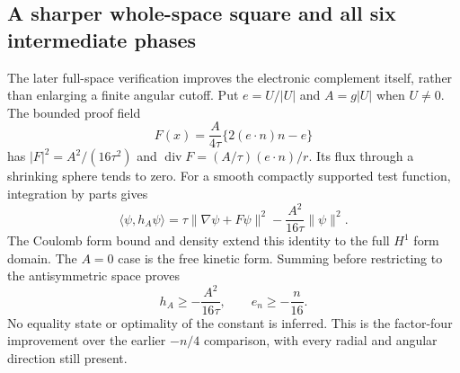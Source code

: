 \subsection{A sharper whole-space square and all six intermediate phases}
\label{sec:atomic-square-12}

The later full-space verification improves the electronic complement itself,
rather than enlarging a finite angular cutoff. Put $e=U/|U|$ and $A=g|U|$
when $U\ne0$. The bounded proof field
\begin{equation}
 F(x)=\frac{A}{4\tau}\{2(e\cdot n)n-e\}
\label{eq:point-proof-field-12}
\end{equation}
has $|F|^2=A^2/(16\tau^2)$ and
$\operatorname{div}F=(A/\tau)(e\cdot n)/r$. Its flux through a shrinking
sphere tends to zero. For a smooth compactly supported test function,
integration by parts gives
\begin{equation}
 \langle\psi,h_A\psi\rangle
 =\tau\|\nabla\psi+F\psi\|^2
       -\frac{A^2}{16\tau}\|\psi\|^2.
\end{equation}
The Coulomb form bound and density extend this identity to the full $H^1$
form domain. The $A=0$ case is the free kinetic form. Summing before
restricting to the antisymmetric space proves
\begin{equation}
 h_A\ge-\frac{A^2}{16\tau},\qquad e_n\ge-\frac n{16}.
\label{eq:point-sixteenth-12}
\end{equation}
No equality state or optimality of the constant is inferred. This is the
factor-four improvement over the earlier $-n/4$ comparison, with every
radial and angular direction still present.

